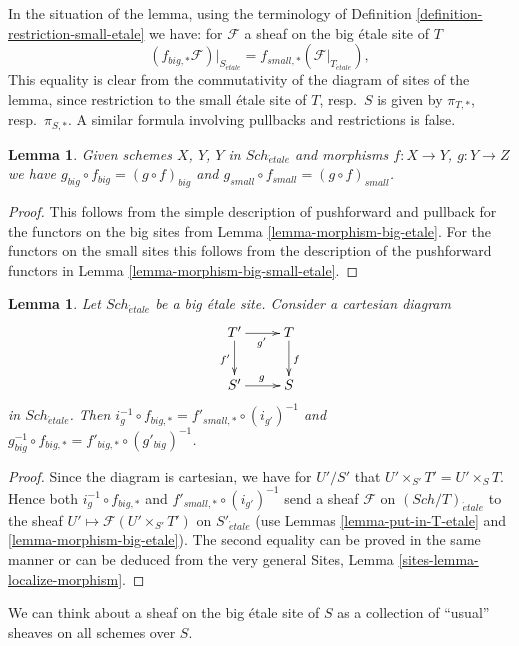 \documentclass{stacks-project}
\theoremstyle{plain}
\newtheorem{lemma}[subsection]{Lemma}
\theoremstyle{definition}
\theoremstyle{remark}
\numberwithin{equation}{subsection}
\def\Sch{\mathit{Sch}}
\def\etale{{\acute{e}tale}}
\begin{document}
\noindent
In the situation of the lemma, using the terminology of
Definition \ref{definition-restriction-small-etale}
we have: for $\mathcal{F}$ a sheaf on the big \'etale site of $T$
$$
(f_{big, *}\mathcal{F})|_{S_\etale} =
f_{small, *}(\mathcal{F}|_{T_\etale}),
$$
This equality is clear from the commutativity of the diagram of
sites of the lemma, since restriction to the small \'etale site of
$T$, resp.\ $S$ is given by $\pi_{T, *}$, resp.\ $\pi_{S, *}$. A similar
formula involving pullbacks and restrictions is false.

\begin{lemma}
\label{lemma-composition-etale}
Given schemes $X$, $Y$, $Y$ in $\Sch_\etale$
and morphisms $f : X \to Y$, $g : Y \to Z$ we have
$g_{big} \circ f_{big} = (g \circ f)_{big}$ and
$g_{small} \circ f_{small} = (g \circ f)_{small}$.
\end{lemma}

\begin{proof}
This follows from the simple description of pushforward
and pullback for the functors on the big sites from
Lemma \ref{lemma-morphism-big-etale}. For the functors
on the small sites this follows from the description of
the pushforward functors in Lemma \ref{lemma-morphism-big-small-etale}.
\end{proof}

\begin{lemma}
\label{lemma-morphism-big-small-cartesian-diagram-etale}
Let $\Sch_\etale$ be a big \'etale site. Consider a cartesian diagram
$$
\xymatrix{
T' \ar[r]_{g'} \ar[d]_{f'} & T \ar[d]^f \\
S' \ar[r]^g & S
}
$$
in $\Sch_\etale$. Then
$i_g^{-1} \circ f_{big, *} = f'_{small, *} \circ (i_{g'})^{-1}$
and $g_{big}^{-1} \circ f_{big, *} = f'_{big, *} \circ (g'_{big})^{-1}$.
\end{lemma}

\begin{proof}
Since the diagram is cartesian, we have for $U'/S'$
that $U' \times_{S'} T' = U' \times_S T$. Hence both
$i_g^{-1} \circ f_{big, *}$ and $f'_{small, *} \circ (i_{g'})^{-1}$
send a sheaf $\mathcal{F}$ on $(\Sch/T)_\etale$ to the sheaf
$U' \mapsto \mathcal{F}(U' \times_{S'} T')$ on $S'_\etale$
(use Lemmas \ref{lemma-put-in-T-etale} and \ref{lemma-morphism-big-etale}).
The second equality can be proved in the same manner or can be
deduced from the very general
Sites, Lemma \ref{sites-lemma-localize-morphism}.
\end{proof}

\noindent
We can think about a sheaf on the big \'etale site of $S$ as a collection
of ``usual'' sheaves on all schemes over $S$.
\end{document}
